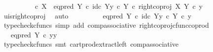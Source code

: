 \begin{isabellebody}
\ \ \ \ \ \ \ \ {\isacharequal}{\kern0pt}\ {\isacharparenleft}{\kern0pt}{\isasymf}\ {\isasymcirc}\isactrlsub c\ {\isasymbeta}\isactrlbsub X\isactrlesub {\isacharparenright}{\kern0pt}\ {\isasymamalg}\ {\isacharparenleft}{\kern0pt}eq{\isacharunderscore}{\kern0pt}pred\ Y\ {\isasymcirc}\isactrlsub c\ {\isasymlangle}id\isactrlsub c\ Y{\isacharcomma}{\kern0pt}y\ {\isasymcirc}\isactrlsub c\ {\isasymbeta}\isactrlbsub Y\isactrlesub {\isasymrangle}{\isacharparenright}{\kern0pt}\ {\isasymcirc}\isactrlsub c\ right{\isacharunderscore}{\kern0pt}coproj\ X\ Y\ {\isasymcirc}\isactrlsub c\ y{\isachardoublequoteclose}\isanewline
\ \ \ \ \ \ \isamarkupfalse%
\ u{\isacharunderscore}{\kern0pt}is{\isacharunderscore}{\kern0pt}right{\isacharunderscore}{\kern0pt}coproj\ \isamarkupfalse%
\ auto\isanewline
\ \ \ \ \isamarkupfalse%
\ \isamarkupfalse%
\ {\isachardoublequoteopen}{\isachardot}{\kern0pt}{\isachardot}{\kern0pt}{\isachardot}{\kern0pt}\ {\isacharequal}{\kern0pt}\ {\isacharparenleft}{\kern0pt}eq{\isacharunderscore}{\kern0pt}pred\ Y\ {\isasymcirc}\isactrlsub c\ {\isasymlangle}id\isactrlsub c\ Y{\isacharcomma}{\kern0pt}y\ {\isasymcirc}\isactrlsub c\ {\isasymbeta}\isactrlbsub Y\isactrlesub {\isasymrangle}{\isacharparenright}{\kern0pt}\ {\isasymcirc}\isactrlsub c\ y{\isachardoublequoteclose}\isanewline
\ \ \ \ \ \ \isamarkupfalse%
\ {\isacharparenleft}{\kern0pt}typecheck{\isacharunderscore}{\kern0pt}cfuncs{\isacharcomma}{\kern0pt}\ simp\ add{\isacharcolon}{\kern0pt}\ comp{\isacharunderscore}{\kern0pt}associative{}\ right{\isacharunderscore}{\kern0pt}coproj{\isacharunderscore}{\kern0pt}cfunc{\isacharunderscore}{\kern0pt}coprod{\isacharparenright}{\kern0pt}\isanewline
\ \ \ \ \isamarkupfalse%
\ \isamarkupfalse%
\ {\isachardoublequoteopen}{\isachardot}{\kern0pt}{\isachardot}{\kern0pt}{\isachardot}{\kern0pt}\ {\isacharequal}{\kern0pt}\ eq{\isacharunderscore}{\kern0pt}pred\ Y\ {\isasymcirc}\isactrlsub c\ {\isasymlangle}y{\isacharcomma}{\kern0pt}y{\isasymrangle}{\isachardoublequoteclose}\isanewline
\ \ \ \ \ \ \isamarkupfalse%
\ {\isacharparenleft}{\kern0pt}typecheck{\isacharunderscore}{\kern0pt}cfuncs{\isacharcomma}{\kern0pt}\ smt\ cart{\isacharunderscore}{\kern0pt}prod{\isacharunderscore}{\kern0pt}extract{\isacharunderscore}{\kern0pt}left\ comp{\isacharunderscore}{\kern0pt}associative{}{\isacharparenright}{\kern0pt}\isanewline
\ \ \ \ \isamarkupfalse%
\ \isamarkupfalse%
\ {\isachardoublequoteopen}{\isachardot}{\kern0pt}{\isachardot}{\kern0pt}{\isachardot}{\kern0pt}\ {\isacharequal}{\kern0pt}\ {\isasymt}{\isachardoublequoteclose}\isanewline

\end{isabellebody}
